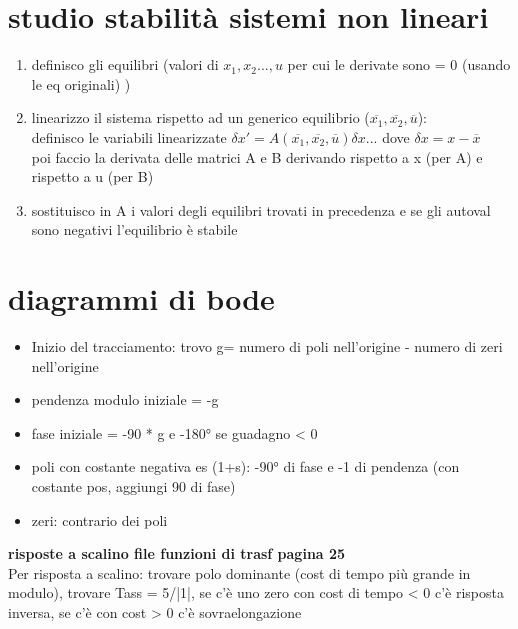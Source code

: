 \documentclass{article}
\begin{document}
	\allsectionsfont{\small}
	\scriptsize
	
	\begin{multicols*}{3}
		\section{studio stabilità sistemi non lineari}
		\begin{enumerate}
			\item definisco gli equilibri (valori di \(x_1,x_2...,u\) per cui le derivate sono = 0 (usando le eq originali) )\\
			\item linearizzo il sistema rispetto ad un generico equilibrio (\(\overline{x_1},\overline{x_2},\overline{u}\)):\\
			definisco le variabili linearizzate \(\delta x' = A(\overline{x_1},\overline{x_2},\overline{u})\delta x\)... dove \(\delta x = x - \overline{x}\)\\ 
			poi faccio la derivata delle matrici A e B derivando rispetto a x (per A) e rispetto a u (per B)
			\item sostituisco in A i valori degli equilibri trovati in precedenza e se gli autoval sono negativi l'equilibrio è stabile
			
			
		\end{enumerate}
		\section{diagrammi di bode}
		\begin{itemize}
			\item Inizio del tracciamento: trovo g= numero di poli nell'origine - numero di zeri nell'origine
			\item pendenza modulo iniziale = -g
			\item fase iniziale = -90 * g e -180° se guadagno < 0
			\item poli con costante negativa es (1+s): -90° di fase e -1 di pendenza (con costante pos, aggiungi 90 di fase)
			\item zeri: contrario dei poli
			 
		\end{itemize}
		
		\textbf{risposte a scalino file funzioni di trasf pagina 25}\\
		Per risposta a scalino: trovare polo dominante (cost di tempo più grande in modulo), trovare Tass = 5/|1|, se c'è uno zero con cost di tempo < 0 c'è risposta inversa, se c'è con cost > 0 c'è sovraelongazione\\\\
		

\end{multicols*}
\end{document}
